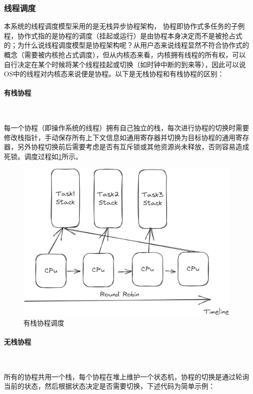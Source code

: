 \subsubsection{线程调度}\label{schedule}

本系统的线程调度模型采用的是无栈异步协程架构， 协程即协作式多任务的子例程，协作式指的是协程的调度（挂起或运行）是由协程本身决定而不是被抢占式的；为什么说线程调度模型是协程架构呢？从用户态来说线程显然不符合协作式的概念（需要被内核抢占式调度），但从内核态来看，内核拥有线程的所有权，可以自行决定在某个时候将某个线程挂起或切换（如时钟中断的到来等），因此可以说OS中的线程对内核态来说便是协程。以下是无栈协程和有栈协程的区别：

\paragraph{有栈协程}~{}

每一个协程（即操作系统的线程）拥有自己独立的栈，每次进行协程的切换时需要修改栈指针，手动保存所有上下文信息如通用寄存器并切换为目标协程的通用寄存器，另外协程切换前后需要考虑是否有互斥锁或其他资源尚未释放，否则容易造成死锁。调度过程如\cref{pic:stack_coroutine}所示。
\begin{figure}[hbt]
    \centering
    \includegraphics[width=.9\linewidth]{figure/stack_coroutine.png}
    \caption{有栈协程调度}
    \label{pic:stack_coroutine}
\end{figure}

\paragraph{无栈协程}~{}

所有的协程共用一个栈，每个协程在堆上维护一个状态机，协程的切换是通过轮询当前的状态，然后根据状态决定是否需要切换，下述代码为简单示例：

